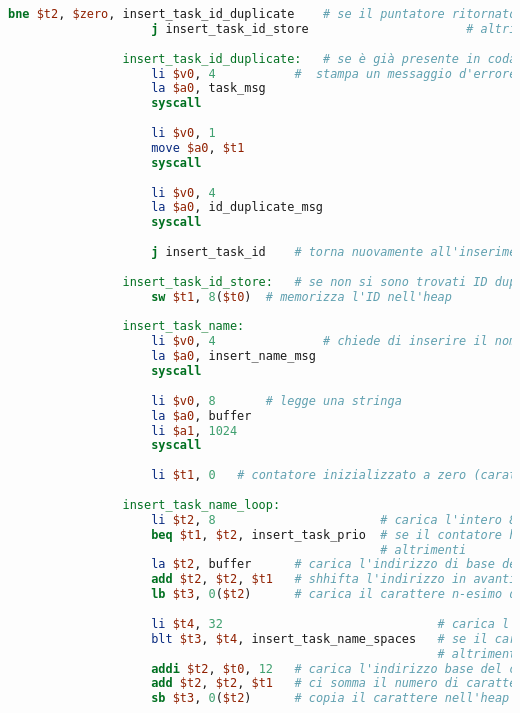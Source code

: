 \begin{center}
\begin{lstlisting}[language=mips, gobble=14, stepnumber=1]
                    bne $t2, $zero, insert_task_id_duplicate	# se il puntatore ritornato da find_id è non nullo, esiste già un task con l'ID inserito
                    j insert_task_id_store						# altrimenti, può memorizzare l'ID tranquillamente
                    
                insert_task_id_duplicate:	# se è già presente in coda un task con l'ID inserito
                    li $v0, 4			#  stampa un messaggio d'errore
                    la $a0, task_msg
                    syscall
                    
                    li $v0, 1
                    move $a0, $t1
                    syscall
                    
                    li $v0, 4
                    la $a0, id_duplicate_msg
                    syscall
                    
                    j insert_task_id	# torna nuovamente all'inserimento dell'ID
                    
                insert_task_id_store:	# se non si sono trovati ID duplicati
                    sw $t1, 8($t0)	# memorizza l'ID nell'heap
                    
                insert_task_name:
                    li $v0, 4				# chiede di inserire il nome del task
                    la $a0, insert_name_msg
                    syscall
                    
                    li $v0, 8		# legge una stringa
                    la $a0, buffer
                    li $a1, 1024
                    syscall
                    
                    li $t1, 0	# contatore inizializzato a zero (caratteri copiati nell'heap)
                    
                insert_task_name_loop:
                    li $t2, 8						# carica l'intero 8
                    beq $t1, $t2, insert_task_prio	# se il contatore ha raggiunto 8, salta all'inserimento della priorità
                									# altrimenti
                    la $t2, buffer		# carica l'indirizzo di base della stringa inserita
                    add $t2, $t2, $t1	# shhifta l'indirizzo in avanti del numero di caratteri già copiati (diciamo n)
                    lb $t3, 0($t2)		# carica il carattere n-esimo della stringa
                	
                    li $t4, 32								# carica l'intero 32 (primo carattere non speciale nella codifica ASCII)
                    blt $t3, $t4, insert_task_name_spaces	# se il carattere letto è un carattere speciale, inizia il loop per inserire spazi
                											# altrimenti	
                    addi $t2, $t0, 12	# carica l'indirizzo base del campo nome del task (indirizzo base del record + 12 byte)
                    add $t2, $t2, $t1	# ci somma il numero di caratteri letti (prima posizione del nome non copiata)
                    sb $t3, 0($t2)		# copia il carattere nell'heap
                	

\end{lstlisting}
\end{center}
